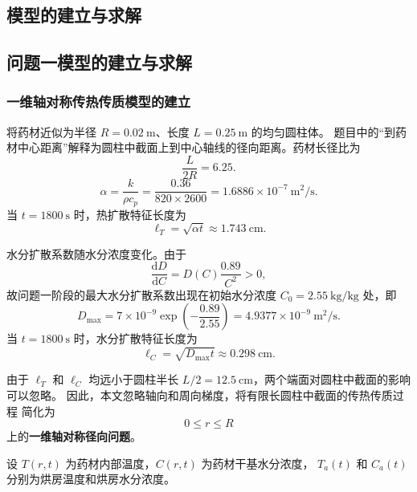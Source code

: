 \documentclass[12pt,a4paper]{article}
\begin{document}
\begin{center}
\section{模型的建立与求解}


\subsection{问题一模型的建立与求解}

\subsubsection{一维轴对称传热传质模型的建立}

将药材近似为半径 $R=0.02\ \mathrm{m}$、长度 $L=0.25\ \mathrm{m}$ 的均匀圆柱体。
题目中的“到药材中心距离”解释为圆柱中截面上到中心轴线的径向距离。药材长径比为
\begin{equation}
\frac{L}{2R}=6.25.
\end{equation}
\begin{equation}
\alpha=\frac{k}{\rho c_p}
=\frac{0.36}{820\times2600}
=1.6886\times10^{-7}\ \mathrm{m^2/s}.
\end{equation}
当 $t=1800\ \mathrm{s}$ 时，热扩散特征长度为
\begin{equation}
\ell_T=\sqrt{\alpha t}\approx1.743\ \mathrm{cm}.
\end{equation}

水分扩散系数随水分浓度变化。由于
\begin{equation}
\frac{\mathrm{d}D}{\mathrm{d}C}
=
D(C)\frac{0.89}{C^2}>0,
\end{equation}
故问题一阶段的最大水分扩散系数出现在初始水分浓度
$C_0=2.55\ \mathrm{kg/kg}$ 处，即
\begin{equation}
D_{\max}
=
7\times10^{-9}
\exp\left(-\frac{0.89}{2.55}\right)
=
4.9377\times10^{-9}\ \mathrm{m^2/s}.
\end{equation}
当 $t=1800\ \mathrm{s}$ 时，水分扩散特征长度为
\begin{equation}
\ell_C=\sqrt{D_{\max}t}\approx0.298\ \mathrm{cm}.
\end{equation}

由于 $\ell_T$ 和 $\ell_C$ 均远小于圆柱半长
$L/2=12.5\ \mathrm{cm}$，两个端面对圆柱中截面的影响可以忽略。
因此，本文忽略轴向和周向梯度，将有限长圆柱中截面的传热传质过程
简化为
\begin{equation}
0\le r\le R
\end{equation}
上的\textbf{一维轴对称径向问题}。

设 $T(r,t)$ 为药材内部温度，$C(r,t)$ 为药材干基水分浓度，
$T_a(t)$ 和 $C_a(t)$ 分别为烘房温度和烘房水分浓度。


\end{center}
\end{document}
